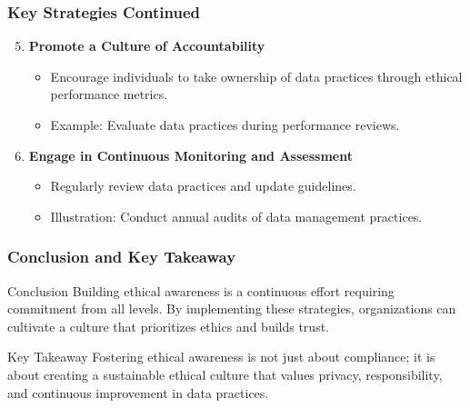 \documentclass{beamer}
\begin{document}
\begin{frame}[fragile]
    \frametitle{Key Strategies Continued}
    \begin{enumerate} 
        \setcounter{enumi}{4} %
        \item \textbf{Promote a Culture of Accountability}
            \begin{itemize}
                \item Encourage individuals to take ownership of data practices through ethical performance metrics.
                \item Example: Evaluate data practices during performance reviews.
            \end{itemize}
        
        \item \textbf{Engage in Continuous Monitoring and Assessment}
            \begin{itemize}
                \item Regularly review data practices and update guidelines.
                \item Illustration: Conduct annual audits of data management practices.
            \end{itemize}
    \end{enumerate}
\end{frame}

\begin{frame}[fragile]
    \frametitle{Conclusion and Key Takeaway}
    \begin{block}{Conclusion}
        Building ethical awareness is a continuous effort requiring commitment from all levels. By implementing these strategies, organizations can cultivate a culture that prioritizes ethics and builds trust.
    \end{block}
    
    \begin{block}{Key Takeaway}
        Fostering ethical awareness is not just about compliance; it is about creating a sustainable ethical culture that values privacy, responsibility, and continuous improvement in data practices.
    \end{block}
\end{frame}
\end{document}
